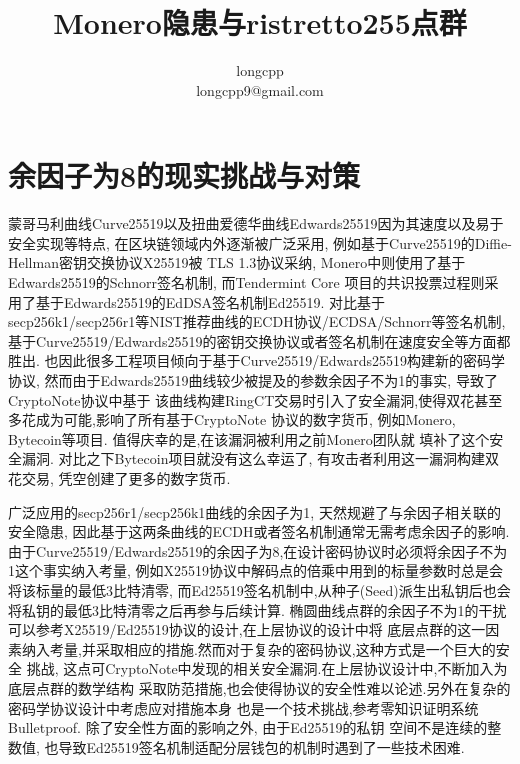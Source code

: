 \documentclass{article}
\begin{document}
\title{Monero隐患与ristretto255点群}
\author{longcpp \\ \small{longcpp9@gmail.com}}

\maketitle

\section{余因子为8的现实挑战与对策}

蒙哥马利曲线Curve25519以及扭曲爱德华曲线Edwards25519因为其速度以及易于安全实现等特点,
在区块链领域内外逐渐被广泛采用, 例如基于Curve25519的Diffie-Hellman密钥交换协议X25519被
TLS 1.3协议采纳, Monero中则使用了基于Edwards25519的Schnorr签名机制, 而Tendermint Core
项目的共识投票过程则采用了基于Edwards25519的EdDSA签名机制Ed25519. 
对比基于secp256k1/secp256r1等NIST推荐曲线的ECDH协议/ECDSA/Schnorr等签名机制, 
基于Curve25519/Edwards25519的密钥交换协议或者签名机制在速度安全等方面都胜出.
也因此很多工程项目倾向于基于Curve25519/Edwards25519构建新的密码学协议,
然而由于Edwards25519曲线较少被提及的参数余因子不为1的事实, 导致了CryptoNote协议中基于
该曲线构建RingCT交易时引入了安全漏洞,使得双花甚至多花成为可能,影响了所有基于CryptoNote
协议的数字货币, 例如Monero, Bytecoin等项目. 值得庆幸的是,在该漏洞被利用之前Monero团队就
填补了这个安全漏洞. 对比之下Bytecoin项目就没有这么幸运了, 有攻击者利用这一漏洞构建双花交易,
凭空创建了更多的数字货币.

广泛应用的secp256r1/secp256k1曲线的余因子为1, 天然规避了与余因子相关联的安全隐患,
因此基于这两条曲线的ECDH或者签名机制通常无需考虑余因子的影响.
由于Curve25519/Edwards25519的余因子为8,在设计密码协议时必须将余因子不为1这个事实纳入考量,
例如X25519协议中解码点的倍乘中用到的标量参数时总是会将该标量的最低3比特清零,
而Ed25519签名机制中,从种子(Seed)派生出私钥后也会将私钥的最低3比特清零之后再参与后续计算.
椭圆曲线点群的余因子不为1的干扰可以参考X25519/Ed25519协议的设计,在上层协议的设计中将
底层点群的这一因素纳入考量,并采取相应的措施.然而对于复杂的密码协议,这种方式是一个巨大的安全
挑战, 这点可CryptoNote中发现的相关安全漏洞.在上层协议设计中,不断加入为底层点群的数学结构
采取防范措施,也会使得协议的安全性难以论述.另外在复杂的密码学协议设计中考虑应对措施本身
也是一个技术挑战,参考零知识证明系统Bulletproof. 除了安全性方面的影响之外, 由于Ed25519的私钥
空间不是连续的整数值, 也导致Ed25519签名机制适配分层钱包的机制时遇到了一些技术困难. 
\end{document}
